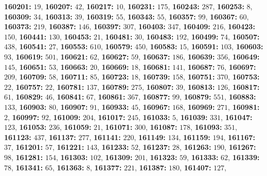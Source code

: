 \textsf{\bfseries 160201:} $19$, \textsf{\bfseries 160207:} $42$, \textsf{\bfseries 160217:} $10$, \textsf{\bfseries 160231:} $175$, \textsf{\bfseries 160243:} $287$, \textsf{\bfseries 160253:} $8$, \textsf{\bfseries 160309:} $34$, \textsf{\bfseries 160313:} $39$, \textsf{\bfseries 160319:} $55$, \textsf{\bfseries 160343:} $55$, \textsf{\bfseries 160357:} $99$, \textsf{\bfseries 160367:} $60$, \textsf{\bfseries 160373:} $219$, \textsf{\bfseries 160387:} $146$, \textsf{\bfseries 160397:} $307$, \textsf{\bfseries 160403:} $347$, \textsf{\bfseries 160409:} $216$, \textsf{\bfseries 160423:} $150$, \textsf{\bfseries 160441:} $130$, \textsf{\bfseries 160453:} $21$, \textsf{\bfseries 160481:} $30$, \textsf{\bfseries 160483:} $192$, \textsf{\bfseries 160499:} $74$, \textsf{\bfseries 160507:} $438$, \textsf{\bfseries 160541:} $27$, \textsf{\bfseries 160553:} $610$, \textsf{\bfseries 160579:} $450$, \textsf{\bfseries 160583:} $15$, \textsf{\bfseries 160591:} $103$, \textsf{\bfseries 160603:} $93$, \textsf{\bfseries 160619:} $501$, \textsf{\bfseries 160621:} $62$, \textsf{\bfseries 160627:} $59$, \textsf{\bfseries 160637:} $186$, \textsf{\bfseries 160639:} $356$, \textsf{\bfseries 160649:} $145$, \textsf{\bfseries 160651:} $53$, \textsf{\bfseries 160663:} $20$, \textsf{\bfseries 160669:} $18$, \textsf{\bfseries 160681:} $141$, \textsf{\bfseries 160687:} $76$, \textsf{\bfseries 160697:} $209$, \textsf{\bfseries 160709:} $58$, \textsf{\bfseries 160711:} $85$, \textsf{\bfseries 160723:} $18$, \textsf{\bfseries 160739:} $158$, \textsf{\bfseries 160751:} $370$, \textsf{\bfseries 160753:} $22$, \textsf{\bfseries 160757:} $22$, \textsf{\bfseries 160781:} $137$, \textsf{\bfseries 160789:} $275$, \textsf{\bfseries 160807:} $39$, \textsf{\bfseries 160813:} $126$, \textsf{\bfseries 160817:} $61$, \textsf{\bfseries 160829:} $46$, \textsf{\bfseries 160841:} $67$, \textsf{\bfseries 160861:} $367$, \textsf{\bfseries 160877:} $99$, \textsf{\bfseries 160879:} $551$, \textsf{\bfseries 160883:} $133$, \textsf{\bfseries 160903:} $80$, \textsf{\bfseries 160907:} $91$, \textsf{\bfseries 160933:} $45$, \textsf{\bfseries 160967:} $168$, \textsf{\bfseries 160969:} $271$, \textsf{\bfseries 160981:} $2$, \textsf{\bfseries 160997:} $92$, \textsf{\bfseries 161009:} $204$, \textsf{\bfseries 161017:} $245$, \textsf{\bfseries 161033:} $5$, \textsf{\bfseries 161039:} $331$, \textsf{\bfseries 161047:} $123$, \textsf{\bfseries 161053:} $236$, \textsf{\bfseries 161059:} $21$, \textsf{\bfseries 161071:} $300$, \textsf{\bfseries 161087:} $178$, \textsf{\bfseries 161093:} $351$, \textsf{\bfseries 161123:} $437$, \textsf{\bfseries 161137:} $277$, \textsf{\bfseries 161141:} $220$, \textsf{\bfseries 161149:} $134$, \textsf{\bfseries 161159:} $194$, \textsf{\bfseries 161167:} $37$, \textsf{\bfseries 161201:} $57$, \textsf{\bfseries 161221:} $143$, \textsf{\bfseries 161233:} $52$, \textsf{\bfseries 161237:} $28$, \textsf{\bfseries 161263:} $190$, \textsf{\bfseries 161267:} $98$, \textsf{\bfseries 161281:} $154$, \textsf{\bfseries 161303:} $102$, \textsf{\bfseries 161309:} $201$, \textsf{\bfseries 161323:} $59$, \textsf{\bfseries 161333:} $62$, \textsf{\bfseries 161339:} $78$, \textsf{\bfseries 161341:} $65$, \textsf{\bfseries 161363:} $8$, \textsf{\bfseries 161377:} $221$, \textsf{\bfseries 161387:} $180$, \textsf{\bfseries 161407:} $127$, 
